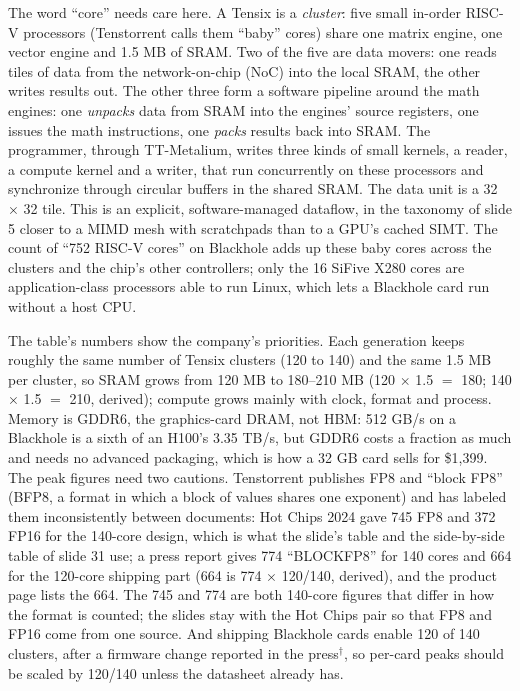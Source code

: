 \documentclass[11pt,letterpaper]{article}
\begin{document}
The word ``core'' needs care here. A Tensix is a \emph{cluster}: five small in-order RISC-V processors (Tenstorrent calls them ``baby'' cores) share one matrix engine, one vector engine and 1.5 MB of SRAM. Two of the five are data movers: one reads tiles of data from the network-on-chip (NoC) into the local SRAM, the other writes results out. The other three form a software pipeline around the math engines: one \emph{unpacks} data from SRAM into the engines' source registers, one issues the math instructions, one \emph{packs} results back into SRAM. The programmer, through TT-Metalium, writes three kinds of small kernels, a reader, a compute kernel and a writer, that run concurrently on these processors and synchronize through circular buffers in the shared SRAM. The data unit is a 32 $\times$ 32 tile. This is an explicit, software-managed dataflow, in the taxonomy of slide 5 closer to a MIMD mesh with scratchpads than to a GPU's cached SIMT. The count of ``752 RISC-V cores'' on Blackhole adds up these baby cores across the clusters and the chip's other controllers; only the 16 SiFive X280 cores are application-class processors able to run Linux, which lets a Blackhole card run without a host CPU.

The table's numbers show the company's priorities. Each generation keeps roughly the same number of Tensix clusters (120 to 140) and the same 1.5 MB per cluster, so SRAM grows from 120 MB to 180--210 MB (120 $\times$ 1.5 $=$ 180; 140 $\times$ 1.5 $=$ 210, derived); compute grows mainly with clock, format and process. Memory is GDDR6, the graphics-card DRAM, not HBM: 512 GB/s on a Blackhole is a sixth of an H100's 3.35 TB/s, but GDDR6 costs a fraction as much and needs no advanced packaging, which is how a 32 GB card sells for \$1{,}399. The peak figures need two cautions. Tenstorrent publishes FP8 and ``block FP8'' (BFP8, a format in which a block of values shares one exponent) and has labeled them inconsistently between documents: Hot Chips 2024 gave 745 FP8 and 372 FP16 for the 140-core design, which is what the slide's table and the side-by-side table of slide 31 use; a press report gives 774 ``BLOCKFP8'' for 140 cores and 664 for the 120-core shipping part (664 is 774 $\times$ 120/140, derived), and the product page lists the 664. The 745 and 774 are both 140-core figures that differ in how the format is counted; the slides stay with the Hot Chips pair so that FP8 and FP16 come from one source. And shipping Blackhole cards enable 120 of 140 clusters, after a firmware change reported in the press$^\dagger$, so per-card peaks should be scaled by 120/140 unless the datasheet already has.
\end{document}
